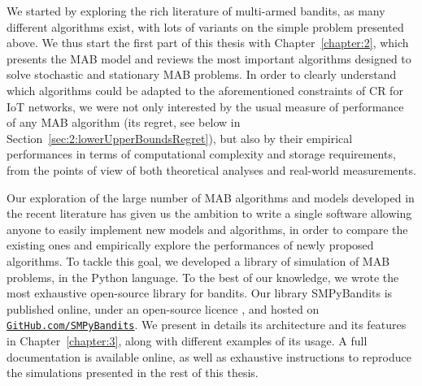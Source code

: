 %
We started by exploring the rich literature of multi-armed bandits,
as many different algorithms exist, with lots of variants on the simple problem presented above.
We thus start the first part of this thesis with Chapter~\ref{chapter:2}, which presents the MAB model and reviews the most important algorithms designed to solve stochastic and stationary MAB problems.
%
In order to clearly understand which algorithms could be adapted to the aforementioned constraints of CR for IoT networks,
we were not only interested by the usual measure of performance of any MAB algorithm (its regret, see below in Section~\ref{sec:2:lowerUpperBoundsRegret}),
but also by their empirical performances in terms of computational complexity and storage requirements, from the points of view of both theoretical analyses and real-world measurements.


%
Our exploration of the large number of MAB algorithms and models developed in the recent literature
has given us the ambition to write a single software allowing anyone to easily implement new models and algorithms, in order to compare the existing ones and empirically explore the performances of newly proposed algorithms.
To tackle this goal, we developed a library of simulation of MAB problems, in the Python language.
%
To the best of our knowledge, we wrote the most exhaustive open-source library for bandits. Our library SMPyBandits is published online, under an open-source licence \cite{SMPyBanditsJMLR,SMPyBandits}, and hosted on \href{https://GitHub.com/SMPyBandits}{\texttt{GitHub.com/SMPyBandits}}.
We present in details its architecture and its features in Chapter~\ref{chapter:3}, along with different examples of its usage.
A full documentation is available online, as well as exhaustive instructions to reproduce the simulations presented in the rest of this thesis.


